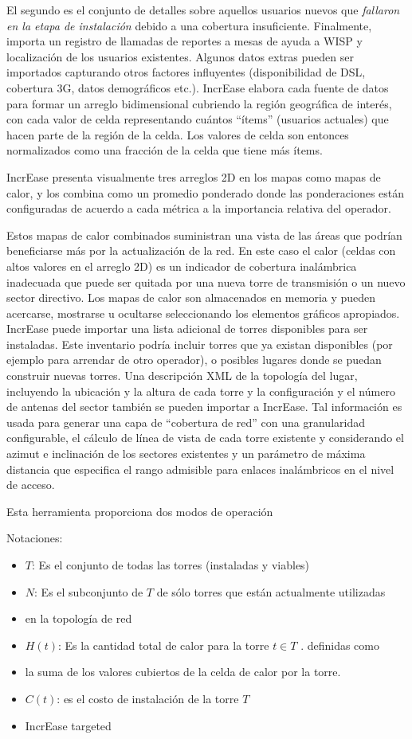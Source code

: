 \documentclass[]{article}
\begin{document}
El segundo es el conjunto de detalles sobre aquellos usuarios nuevos que
\emph{fallaron en la etapa de instalación} debido a una cobertura
insuficiente. Finalmente, importa un registro de llamadas de reportes a
mesas de ayuda a WISP y localización de los usuarios existentes. Algunos
datos extras pueden ser importados capturando otros factores influyentes
(disponibilidad de DSL, cobertura 3G, datos demográficos etc.). IncrEase
elabora cada fuente de datos para formar un arreglo bidimensional
cubriendo la región geográfica de interés, con cada valor de celda
representando cuántos ``ítems'' (usuarios actuales) que hacen parte de
la región de la celda. Los valores de celda son entonces normalizados
como una fracción de la celda que tiene más ítems.

IncrEase presenta visualmente tres arreglos 2D en los mapas como mapas
de calor, y los combina como un promedio ponderado donde las
ponderaciones están configuradas de acuerdo a cada métrica a la
importancia relativa del operador.

Estos mapas de calor combinados suministran una vista de las áreas que
podrían beneficiarse más por la actualización de la red. En este caso el
calor (celdas con altos valores en el arreglo 2D) es un indicador de
cobertura inalámbrica inadecuada que puede ser quitada por una nueva
torre de transmisión o un nuevo sector directivo. Los mapas de calor son
almacenados en memoria y pueden acercarse, mostrarse u ocultarse
seleccionando los elementos gráficos apropiados. IncrEase puede importar
una lista adicional de torres disponibles para ser instaladas. Este
inventario podría incluir torres que ya existan disponibles (por ejemplo
para arrendar de otro operador), o posibles lugares donde se puedan
construir nuevas torres. Una descripción XML de la topología del lugar,
incluyendo la ubicación y la altura de cada torre y la configuración y
el número de antenas del sector también se pueden importar a IncrEase.
Tal información es usada para generar una capa de ``cobertura de red''
con una granularidad configurable, el cálculo de línea de vista de cada
torre existente y considerando el azimut e inclinación de los sectores
existentes y un parámetro de máxima distancia que especifica el rango
admisible para enlaces inalámbricos en el nivel de acceso.

Esta herramienta proporciona dos modos de operación

Notaciones:

\begin{itemize}
\item
  \(T\): Es el conjunto de todas las torres (instaladas y viables)
\item
  \(N\): Es el subconjunto de \(T\) de sólo torres que están actualmente
  utilizadas
\item
  en la topología de red
\item
  \(H(t)\): Es la cantidad total de calor para la torre \(t \in T\) .
  definidas como
\item
  la suma de los valores cubiertos de la celda de calor por la torre.
\item
  \(C(t)\): es el costo de instalación de la torre \(T\)
\item
  IncrEase targeted
\end{itemize}
\end{document}
